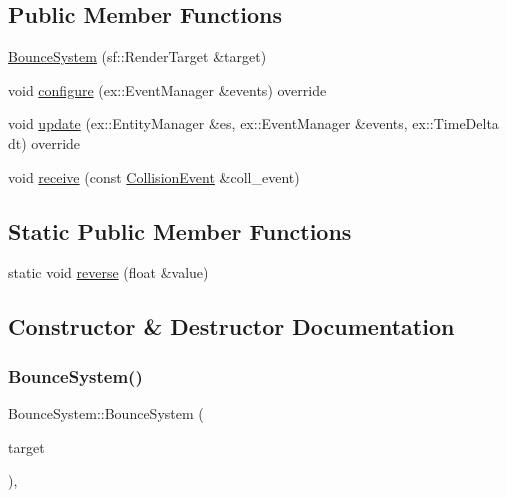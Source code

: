 \subsection*{Public Member Functions}
\begin{DoxyCompactItemize}
\item 
\hyperlink{classBounceSystem_aefde06fe082b4ae32d34022b291a47e1}{Bounce\+System} (sf\+::\+Render\+Target \&target)
\item 
void \hyperlink{classBounceSystem_a64c3ae9db2a670af61b47be39c4fb353}{configure} (ex\+::\+Event\+Manager \&events) override
\item 
void \hyperlink{classBounceSystem_aeae5238af04e5eec67acd6ad897b9c3f}{update} (ex\+::\+Entity\+Manager \&es, ex\+::\+Event\+Manager \&events, ex\+::\+Time\+Delta dt) override
\item 
void \hyperlink{classBounceSystem_a26bcb419f819afb3c4a19364585c72a3}{receive} (const \hyperlink{structCollisionEvent}{Collision\+Event} \&coll\+\_\+event)
\end{DoxyCompactItemize}
\subsection*{Static Public Member Functions}
\begin{DoxyCompactItemize}
\item 
static void \hyperlink{classBounceSystem_ae7fdd15d7e5dffed1ec3fa997cc64e8f}{reverse} (float \&value)
\end{DoxyCompactItemize}


\subsection{Constructor \& Destructor Documentation}
\mbox{\label{classBounceSystem_aefde06fe082b4ae32d34022b291a47e1}} 
\subsubsection{\texorpdfstring{Bounce\+System()}{BounceSystem()}}
{\footnotesize\ttfamily Bounce\+System\+::\+Bounce\+System (\begin{DoxyParamCaption}\item[{sf\+::\+Render\+Target \&}]{target }\end{DoxyParamCaption})\hspace{0.3cm}{\ttfamily [inline]}, {\ttfamily [explicit]}}



